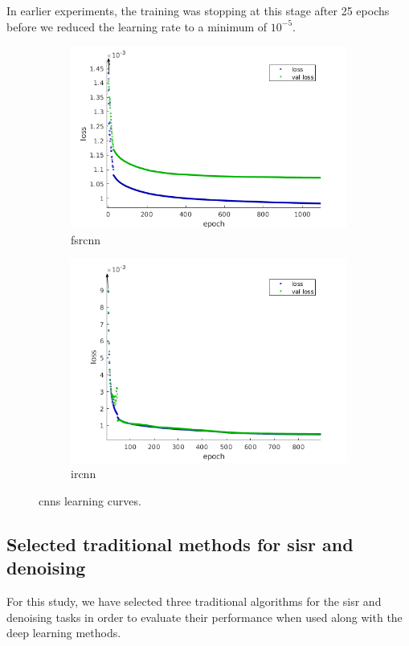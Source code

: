 In earlier experiments, the training was stopping at this stage after 25 epochs before we reduced the learning rate to a minimum of $10^{-5}$.

\begin{figure}[h]
	\centering
	\begin{subfigure}{0.49\textwidth}
		\includegraphics[width=\textwidth]{images/fsrcnn_train.png}
		\caption{\gls{fsrcnn}}
	\end{subfigure}
	\begin{subfigure}{0.49\textwidth}
		\includegraphics[width=\textwidth]{images/ircnn_train.png}
		\caption{\gls{ircnn}}
	\end{subfigure}
	\caption{\glspl{cnn} learning curves.}
	\label{fig:training}
\end{figure}

\subsection{Selected traditional methods for \gls{sisr} and denoising}
For this study, we have selected three traditional algorithms for the \gls{sisr} and denoising tasks in order to evaluate their performance when used along with the deep learning methods.

